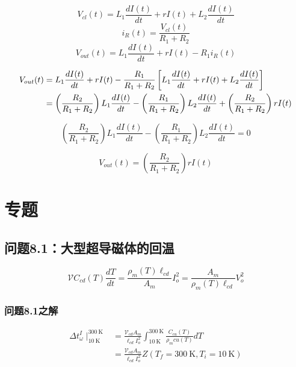 \begin{equation}%
V_{cl}(t)=L_1\frac{dI(t)}{dt}+rI(t)+L_2\frac{dI(t)}{dt}
\end{equation}
\begin{equation}%
i_R(t)=\frac{V_{cl}(t)}{R_1+R_2}
\end{equation}
\begin{equation}%
V_{out}(t)=L_1\frac{dI(t)}{dt}+rI(t)-R_1i_R(t)
\end{equation}


\begin{align}%
V_{out}(t)&=L_1\frac{dI(t)}{dt}+rI(t) 
-\frac{R_1}{R_1+R_2}\left[L_1\frac{dI(t)}{dt}+rI(t)+L_2\frac{dI(t)}{dt}\right] \\\notag
&=\left(\frac{R_2}{R_1+R_2}\right)L_1\frac{dI(t)}{dt} 
-\left(\frac{R_1}{R_1+R_2}\right)L_2\frac{dI(t)}{dt}+\left(\frac{R_2}{R_1+R_2}\right)rI(t)
\end{align}



\begin{equation}%
\left(\frac{R_2}{R_1+R_2}\right)L_1\frac{dI(t)}{dt}-\left(\frac{R_1}{R_1+R_2}\right)L_2\frac{dI(t)}{dt}=0
\end{equation}


\begin{equation}%
V_{out}(t)=\left(\frac{R_2}{R_1+R_2}\right)rI(t)
\end{equation}


\section{专题}

\subsection{问题8.1：大型超导磁体的回温}
\begin{equation}%
\mathcal{V}C_{cd}(T)\frac{dT}{dt}=\frac{\rho_m(T)\ell_{cd}}{A_m}I_{o}^{2} 
=\frac{A_m}{\rho_m(T)\ell_{cd}}V_{o}^{2}
\end{equation}

\subsubsection{问题8.1之解}
\begin{align*}%
\Delta t_{\omega}^{I}\mid_{10\ \mathrm{K}}^{300\ \mathrm{K}}&=\frac{\mathcal{V}_{cd}A_m}{\ell_{cd}I_{o}^{2}}\int_{10\ \mathrm{K}}^{300\ \mathrm{K}}\frac{C_{cu}(T)}{\rho_m{cu}(T)}dT \\
&=\frac{\mathcal{V}_{cd}A_m}{\ell_{cd}I_{o}^{2}}Z(T_f=300\ \mathrm{K},T_i=10\ \mathrm{K})
\end{align*}


